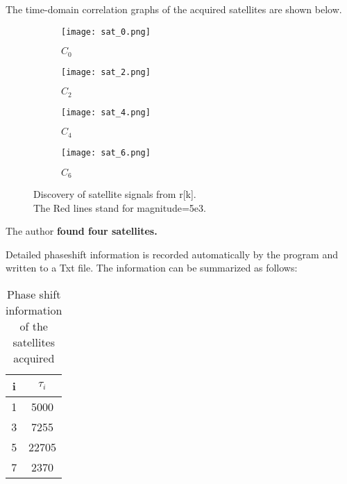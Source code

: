 \documentclass{article}
\begin{document}
\par The time-domain correlation graphs of the acquired satellites are shown below.
\begin{center}
\begin{figure}[H]
    \centering
    \begin{subfigure}[H]{0.45\textwidth}
        \centering
        \texttt{[image: sat\_0.png]}
        \caption{$C_0$}
        \end{subfigure}
    \begin{subfigure}[H]{0.45\textwidth}
        \centering
        \texttt{[image: sat\_2.png]}
        \caption{$C_2$}
    \end{subfigure}

    \begin{subfigure}[H]{0.45\textwidth}
        \centering
        \texttt{[image: sat\_4.png]}
        \caption{$C_4$}
    \end{subfigure}
    \begin{subfigure}[H]{0.45\textwidth}
        \centering
        \texttt{[image: sat\_6.png]}
        \caption{$C_6$}
    \end{subfigure}
    \centering
    \caption{Discovery of satellite signals from r[k].\\The Red lines stand for magnitude=5e3.}
    
    \label{find_satellites}
\end{figure}
\end{center}
\par \indent The author \textbf{found four satellites.}
\par \indent Detailed phaseshift information is recorded automatically by the program and written to a Txt file.
The information can be summarized as follows:

\begin{table}[H]
    \centering
    \begin{tabular}{c|c}
        i & $\tau_i$\\
        \hline
        1 & 5000\\
        3 & 7255\\
        5 & 22705\\
        7 & 2370\\
    \end{tabular}
    \caption{Phase shift information of the satellites acquired}
    \label{tab_compare_all}
\end{table}
\end{document}
